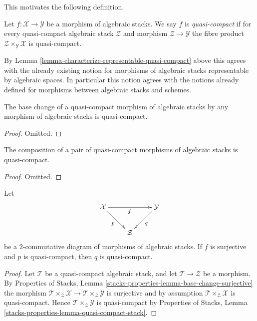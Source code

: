 \noindent
This motivates the following definition.

\begin{definition}
\label{definition-quasi-compact}
Let $f : \mathcal{X} \to \mathcal{Y}$ be a morphism of algebraic stacks.
We say $f$ is {\it quasi-compact} if for every quasi-compact
algebraic stack $\mathcal{Z}$ and morphism $\mathcal{Z} \to \mathcal{Y}$
the fibre product $\mathcal{Z} \times_\mathcal{Y} \mathcal{X}$
is quasi-compact.
\end{definition}

\noindent
By
Lemma \ref{lemma-characterize-representable-quasi-compact}
above this agrees with the already existing notion
for morphisms of algebraic stacks representable by algebraic spaces.
In particular this notion agrees with the notions already defined
for morphisms between algebraic stacks and schemes.

\begin{lemma}
\label{lemma-base-change-quasi-compact}
The base change of a quasi-compact morphism of algebraic stacks
by any morphism of algebraic stacks is quasi-compact.
\end{lemma}

\begin{proof}
Omitted.
\end{proof}

\begin{lemma}
\label{lemma-composition-quasi-compact}
The composition of a pair of quasi-compact morphisms of algebraic stacks
is quasi-compact.
\end{lemma}

\begin{proof}
Omitted.
\end{proof}

\begin{lemma}
\label{lemma-surjection-from-quasi-compact}
Let
$$
\xymatrix{
\mathcal{X} \ar[rr]_f \ar[rd]_p & &
\mathcal{Y} \ar[dl]^q \\
& \mathcal{Z}
}
$$
be a $2$-commutative diagram of morphisms of algebraic stacks.
If $f$ is surjective and $p$ is quasi-compact, then $q$ is quasi-compact.
\end{lemma}

\begin{proof}
Let $\mathcal{T}$ be a quasi-compact algebraic stack, and let
$\mathcal{T} \to \mathcal{Z}$ be a morphism. By
Properties of Stacks,
Lemma \ref{stacks-properties-lemma-base-change-surjective}
the morphism
$\mathcal{T} \times_\mathcal{Z} \mathcal{X} \to
\mathcal{T} \times_\mathcal{Z} \mathcal{Y}$
is surjective and by assumption
$\mathcal{T} \times_\mathcal{Z} \mathcal{X}$
is quasi-compact. Hence
$\mathcal{T} \times_\mathcal{Z} \mathcal{Y}$
is quasi-compact by
Properties of Stacks, Lemma \ref{stacks-properties-lemma-quasi-compact-stack}.
\end{proof}

